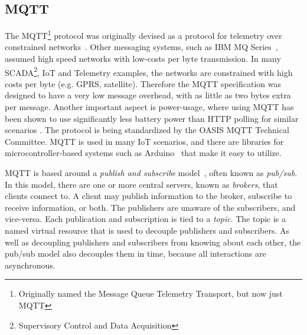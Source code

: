 \documentclass{llncs}
\newif\iflong
\begin{document}
\subsection{MQTT}
The MQTT\footnote{Originally named the Message Queue Telemetry Transport, but now just MQTT} protocol was originally devised 
as a protocol for telemetry over constrained networks~\cite{mqtt-history}. Other messaging systems, such as IBM 
MQ Series~\cite{gilman1996distributed}, assumed high speed networks with low-costs per byte transmission. 
In many SCADA\footnote{Supervisory Control and Data Acquisition}, IoT and Telemetry examples, the networks are constrained 
with high costs per byte (e.g. GPRS, satellite). Therefore the MQTT specification was designed to have a very low message overhead, 
with as little as two bytes extra per message. Another important aspect is power-usage, where using MQTT has been shown to use significantly less battery power
than HTTP polling for similar scenarios \cite{nicholaspowerblog}.  The protocol is being standardized by the OASIS MQTT Technical Committee\cite{mqtt-oasis}. MQTT is used in many IoT scenarios, and there are libraries for microcontroller-based systems such as 
Arduino~\cite{arduino} that make it easy to utilize.

MQTT is based around a \emph{publish and subscribe} model~\cite{eugster2003many}, often known as \emph{pub/sub}.
In this model, there are one or more central servers, known as \emph{brokers}, that clients connect to.
A client may publish information to the broker, subscribe to receive information, or both. The publishers
are unaware of the subscribers, and vice-versa. Each publication and subscription is tied to a \emph{topic}. 
The topic is a named virtual resource that is used to decouple publishers and subscribers. As well as decoupling publishers and subscribers from knowing about each other, the pub/sub model also decouples them in time, because all interactions are asynchronous. 
\iflong
Most pub/sub systems utilize a tree-based model for topics, where there is a hierarchy and wildcard-based matching,
which allows subscribers to subscribe to all topics in a branch of the tree, and MQTT also follows this model. 
For example, a subscriber can subscribe to the topic string ``devices/uk/\#'' which would match topics including 
``devices/uk/hampshire/emsworth'' as well as ``devices/uk/sussex''. The ``\#'' identifies a wildcard that
matches any number of levels within the hierarchy. The ``+'' character identifies matching only a single level. Publishers cannot publish to a wildcard - they must publish to a fully-qualified topic name.
\fi
\end{document}
